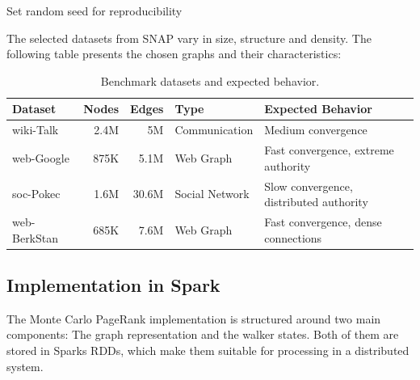\vspace{1.0em}
\begin{algorithm}[H]
\caption{Synthetic Graph Generator}

Set random seed for reproducibility\;
\end{algorithm} 
\vspace{1.0em}

The selected datasets from SNAP vary in size, structure and density. The following table presents the chosen graphs and their characteristics: 

\begin{table}[ht]
\centering
\setlength{\tabcolsep}{6pt}
\renewcommand{\arraystretch}{1.2}
\begin{tabularx}{\linewidth}{l r r l X}
\toprule
\textbf{Dataset} & \textbf{Nodes} & \textbf{Edges} & \textbf{Type} & \textbf{Expected Behavior} \\
\midrule
wiki-Talk    & 2.4M & 5M    & Communication & Medium convergence \\
web-Google   & 875K & 5.1M  & Web Graph & Fast convergence, extreme authority \\
soc-Pokec    & 1.6M & 30.6M & Social Network & Slow convergence, distributed authority \\
web-BerkStan & 685K & 7.6M  & Web Graph & Fast convergence, dense connections \\
\bottomrule
\end{tabularx}
\caption{Benchmark datasets and expected behavior.}
\label{tab:datasets}
\end{table}



\subsection{Implementation in Spark}

The Monte Carlo PageRank implementation is structured around two main components: The graph representation and the walker states. Both of them are stored in Sparks RDDs, which make them suitable for processing in a distributed system.\par

